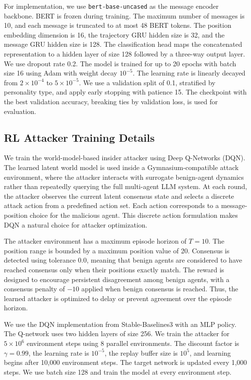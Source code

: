 \documentclass{article}
\theoremstyle{plain}
\theoremstyle{definition}
\theoremstyle{remark}
\begin{document}
For implementation, we use \texttt{bert-base-uncased} as the message encoder backbone. BERT is frozen during training. The maximum number of messages is 10, and each message is truncated to at most 48 BERT tokens. The position embedding dimension is 16, the trajectory GRU hidden size is 32, and the message GRU hidden size is 128. The classification head maps the concatenated representation to a hidden layer of size 128 followed by a three-way output layer. We use dropout rate 0.2. The model is trained for up to 20 epochs with batch size 16 using Adam with weight decay \(10^{-5}\). The learning rate is linearly decayed from \(2\times 10^{-4}\) to \(5\times 10^{-5}\). We use a validation split of 0.1, stratified by personality type, and apply early stopping with patience 15. The checkpoint with the best validation accuracy, breaking ties by validation loss, is used for evaluation.

\subsection{RL Attacker Training Details}
\label{app:rl_attacker_details}

We train the world-model-based insider attacker using Deep Q-Networks (DQN). The learned latent world model is used inside a Gymnasium-compatible attack environment, where the attacker interacts with surrogate benign-agent dynamics rather than repeatedly querying the full multi-agent LLM system. At each round, the attacker observes the current latent consensus state and selects a discrete attack action from a predefined action set. Each action corresponds to a message-position choice for the malicious agent. This discrete action formulation makes DQN a natural choice for attacker optimization.

The attacker environment has a maximum episode horizon of \(T=10\). The position range is bounded by a maximum position value of 20. Consensus is detected using tolerance 0.0, meaning that benign agents are considered to have reached consensus only when their positions exactly match. The reward is designed to encourage persistent disagreement among benign agents, with a consensus penalty of \(-10\) applied when benign consensus is reached. Thus, the learned attacker is optimized to delay or prevent agreement over the episode horizon.

We use the DQN implementation from Stable-Baselines3 with an MLP policy. The Q-network uses two hidden layers of size 256. We train the attacker for \(5\times 10^6\) environment steps using 8 parallel environments. The discount factor is \(\gamma=0.99\), the learning rate is \(10^{-5}\), the replay buffer size is \(10^5\), and learning begins after 10,000 environment steps. The target network is updated every 1,000 steps. We use batch size 128 and train the model at every environment step.
\end{document}
